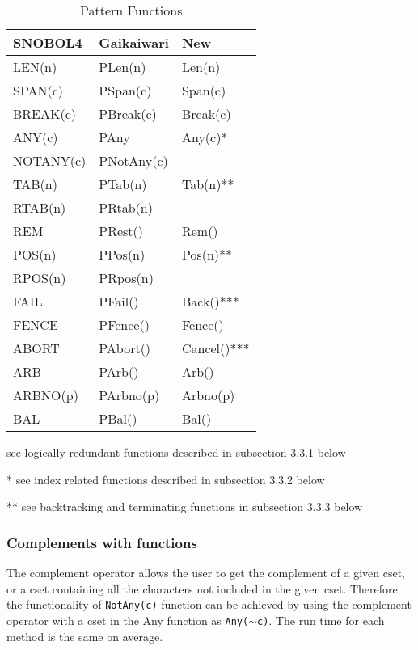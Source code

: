\documentclass{article}
\begin{document}
\begin{table}[ht]
	\centering
	\caption{Pattern Functions}
	\begin{threeparttable}
		\centering
		\begin{tabular}{|l|l|l|}
			\hline\hline
			SNOBOL4 & Gaikaiwari & New \\
			\hline
			LEN(n) & PLen(n) & Len(n) \\
			SPAN(c) & PSpan(c) & Span(c)  \\
			BREAK(c) & PBreak(c) & Break(c) \\
			ANY(c) & PAny & Any(c)* \\
			NOTANY(c) & PNotAny(c) &  \\
			TAB(n) & PTab(n) & Tab(n)** \\
			RTAB(n) & PRtab(n) &  \\
			REM & PRest() & Rem() \\
			POS(n) & PPos(n) & Pos(n)**  \\
			RPOS(n) & PRpos(n) &  \\
			FAIL & PFail() & Back()*** \\
			FENCE & PFence() & Fence() \\
			ABORT & PAbort() & Cancel()*** \\
			ARB & PArb() & Arb() \\
			ARBNO(p) & PArbno(p) & Arbno(p) \\
			BAL & PBal() & Bal() \\
			\hline
		\end{tabular}
		
		\begin{tablenotes}
      		\small
      		\item * see logically redundant functions described in subsection 3.3.1 below
      		\item ** see index related functions described in subsection 3.3.2 below
      		\item *** see backtracking and terminating functions in subsection 3.3.3 below
      	\end{tablenotes}
	\end{threeparttable}
\end{table}

\vspace{1 pc}
\subsubsection{Complements with functions}
The complement operator allows the user to get the complement of a given cset, or a cset containing all the characters not included in the given cset.  Therefore the functionality of \texttt{NotAny(c)} function can be achieved by using the complement operator with a cset in the Any function as \texttt{Any($\sim$c)}.  The run time for each method is the same on average.
\end{document}

